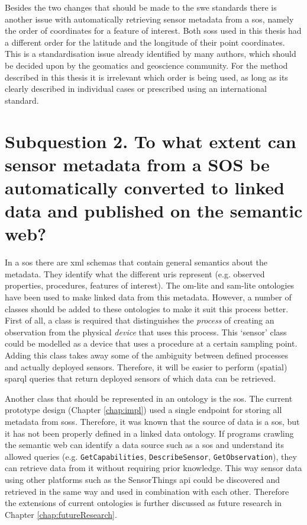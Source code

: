 Besides the two changes that should be made to the \ac{swe} standards there is another issue with automatically retrieving sensor metadata from a \ac{sos}, namely the order of coordinates for a feature of interest. Both \aclp{sos} used in this thesis had a different order for the latitude and the longitude of their point coordinates. This is a standardisation issue already identified by many authors, which should be decided upon by the geomatics and geoscience community. For the method described in this thesis it is irrelevant which order is being used, as long as its clearly described in individual cases or prescribed using an international standard.

\section*{\textbf{Subquestion 2.} To what extent can sensor metadata from a SOS be automatically converted to linked data and published on the semantic web?}%

In a \ac{sos} there are \ac{xml} schemas that contain general semantics about the metadata. They identify what the different \acp{uri} represent (e.g. observed properties, procedures, features of interest). The om-lite and sam-lite ontologies have been used to make linked data from this metadata. However, a number of classes should be added to these ontologies to make it suit this process better. First of all, a class is required that distinguishes the \textit{process} of creating an observation from the physical \textit{device} that uses this process. This `sensor' class could be modelled as a device that uses a procedure at a certain sampling point. Adding this class takes away some of the ambiguity between defined processes and actually deployed sensors. Therefore, it will be easier to perform (spatial) \ac{sparql} queries that return deployed sensors of which data can be retrieved.  

Another class that should be represented in an ontology is the \acl{sos}. The current prototype design (Chapter \ref{chap:impl}) used a single endpoint for storing all metadata from \aclp{sos}. Therefore, it was known that the source of data is a \ac{sos}, but it has not been properly defined in a linked data ontology. If programs crawling the semantic web can identify a data source such as a \ac{sos} and understand its allowed queries (e.g. \texttt{GetCapabilities}, \texttt{DescribeSensor}, \texttt{GetObservation}), they can retrieve data from it without requiring prior knowledge. This way sensor data using other platforms such as the SensorThings \ac{api} could be discovered and retrieved in the same way and used in combination with each other. Therefore the extensions of current ontologies is further discussed as future research in Chapter \ref{chap:futureResearch}.  

